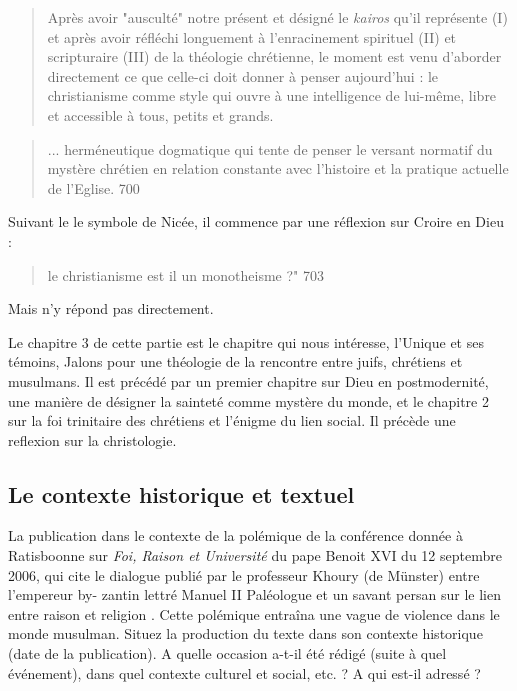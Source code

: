  \begin{quote}
     Après avoir "ausculté" notre présent et désigné le \textit{kairos} qu'il représente (I) et après avoir réfléchi longuement à l'enracinement spirituel (II) et scripturaire (III) de la théologie chrétienne, le moment est venu d'aborder directement ce que celle-ci doit donner à penser aujourd'hui : le christianisme comme style qui ouvre à une intelligence de lui-même, libre et accessible à tous, petits et grands. 
     \cite[p 699]{theobald_christianisme_2007}
 \end{quote}
\begin{quote}
    

... herméneutique dogmatique qui tente de penser le versant normatif du mystère chrétien en relation constante avec l'histoire et la pratique actuelle de l'Eglise.  700
\end{quote}
Suivant le le symbole de Nicée, il commence par une réflexion sur Croire en Dieu  :
\begin{quote}
    le christianisme est il un monotheisme ?" 703
\end{quote}
Mais n'y répond pas directement.


Le chapitre 3 de cette partie est le chapitre qui nous intéresse, l'Unique et ses témoins, Jalons pour une théologie de la rencontre entre juifs, chrétiens et musulmans.
Il est précédé par un premier chapitre sur Dieu en postmodernité, une manière de désigner la sainteté comme mystère du monde, et le chapitre 2 sur la foi trinitaire des chrétiens et l'énigme du lien social.
Il précède une reflexion sur la christologie. 




\subsection{Le contexte historique et textuel}

La publication dans le contexte de la polémique de la conférence donnée à Ratisboonne sur \textit{Foi, Raison et Université} du pape Benoit XVI du 12 septembre 2006, qui cite le dialogue publié par le professeur Khoury (de Münster) entre l’empereur by-
zantin lettré Manuel II Paléologue et un savant persan sur le lien entre raison et religion . Cette polémique entraîna une vague de violence dans le monde musulman. 
Situez la production du texte dans son contexte historique (date de la publication). A quelle occasion a-t-il été rédigé (suite à quel événement), dans quel contexte culturel et social, etc. ? A qui est-il adressé ?

